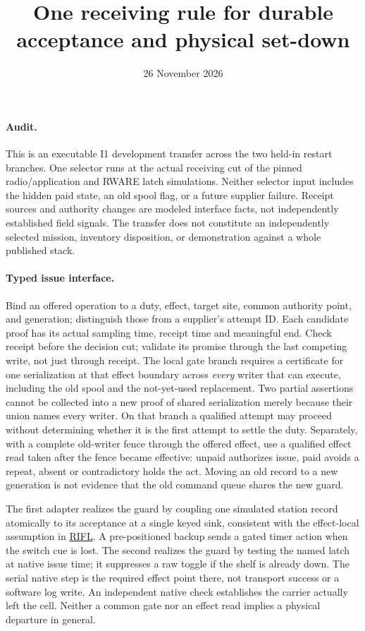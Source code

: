 \documentclass{article}
\title{One receiving rule for durable acceptance and physical set-down}
\author{}
\date{26 November 2026}
\begin{document}
\maketitle

\paragraph{Audit.}
This is an executable I1 development transfer across the two held-in
restart branches. One selector runs at the actual receiving cut of the
pinned radio/application and RWARE latch simulations. Neither selector
input includes the hidden paid state, an old spool flag, or a future
supplier failure. Receipt sources and authority changes are modeled
interface facts, not independently established field signals.
The transfer does not constitute an independently selected mission,
inventory disposition, or demonstration against a whole published stack.

\paragraph{Typed issue interface.}
Bind an offered operation to a duty, effect, target site, common authority
point, and generation; distinguish those from a supplier's attempt ID.
Each candidate proof has its actual sampling time, receipt time and
meaningful end. Check receipt before the decision cut; validate its
promise through the last competing write, not just through receipt.
The local gate branch requires a certificate for one serialization at
that effect boundary across \emph{every} writer that can execute, including
the old spool and the not-yet-used replacement. Two partial assertions
cannot be collected into a new proof of shared serialization merely
because their union names every writer.
On that branch a qualified attempt may proceed without determining
whether it is the first attempt to settle the duty. Separately,
with a complete old-writer fence through the offered effect, use
a qualified effect read taken after the fence became effective:
unpaid authorizes issue, paid avoids a repeat, absent or contradictory
holds the act. Moving an old record to a new generation is not evidence
that the old command queue shares the new guard.

The first adapter realizes the guard by coupling one simulated
station record atomically to its acceptance at a single keyed sink,
consistent with the effect-local assumption in
\href{https://web.stanford.edu/~ouster/cgi-bin/papers/rifl.pdf}{RIFL}.
A pre-positioned backup sends a gated timer action when the switch cue
is lost. The second realizes the guard by testing the named latch
at native issue time; it suppresses a raw toggle if the shelf is already
down. The serial native step is the required effect point there,
not transport success or a software log write. An independent native
check establishes the carrier actually left the cell. Neither a common
gate nor an effect read implies a physical departure in general.
\end{document}
